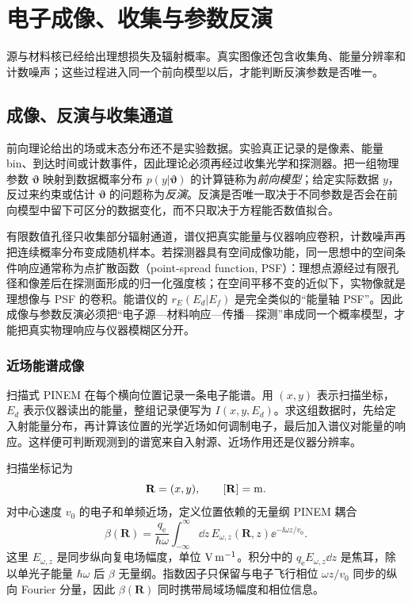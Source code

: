 \chapter{电子成像、收集与参数反演}\label{chap:electron-imaging-inversion}

源与材料核已经给出理想损失及辐射概率。真实图像还包含收集角、能量分辨率和计数噪声；这些过程进入同一个前向模型以后，才能判断反演参数是否唯一。

\section{成像、反演与收集通道}

前向理论给出的场或末态分布还不是实验数据。实验真正记录的是像素、能量 bin、到达时间或计数事件，因此理论必须再经过收集光学和探测器。把一组物理参数 $\boldsymbol\vartheta$ 映射到数据概率分布 $p(y|\boldsymbol\vartheta)$ 的计算链称为\emph{前向模型}；给定实际数据 $y$，反过来约束或估计 $\boldsymbol\vartheta$ 的问题称为\emph{反演}。反演是否唯一取决于不同参数是否会在前向模型中留下可区分的数据变化，而不只取决于方程能否数值拟合。

有限数值孔径只收集部分辐射通道，谱仪把真实能量与仪器响应卷积，计数噪声再把连续概率分布变成随机样本。若探测器具有空间成像功能，同一思想中的空间条件响应通常称为点扩散函数（point-spread function, PSF）：理想点源经过有限孔径和像差后在探测面形成的归一化强度核；在空间平移不变的近似下，实物像就是理想像与 PSF 的卷积。能谱仪的 $r_E(E_d|E_f)$ 是完全类似的“能量轴 PSF”。因此成像与参数反演必须把“电子源—材料响应—传播—探测”串成同一个概率模型，才能把真实物理响应与仪器模糊区分开。

\subsection{近场能谱成像}\label{subsec:nearfield-spectrum-imaging-dp19}

扫描式 PINEM 在每个横向位置记录一条电子能谱。用 $(x,y)$ 表示扫描坐标，$E_d$ 表示仪器读出的能量，整组记录便写为 $I(x,y,E_d)$。求这组数据时，先给定入射能量分布，再计算该位置的光学近场如何调制电子，最后加入谱仪对能量的响应。这样便可判断观测到的谱宽来自入射源、近场作用还是仪器分辨率。

扫描坐标记为
\begin{equation*}
\mathbf R=(x,y),
\qquad [\mathbf R]={\rm m}.
\end{equation*}
对中心速度 $v_0$ 的电子和单频近场，定义位置依赖的无量纲 PINEM 耦合
\begin{equation}
\boxed{
\beta(\mathbf R)
=\frac{q_{\mathrm e}}{\hbar\omega}
\int_{-\infty}^{\infty}\dd z\,
E_{\omega,z}(\mathbf R,z)
\ee^{-\ii\omega z/v_0}.}
\label{eq:pinem-spatial-beta-dp19}
\end{equation}
这里 $E_{\omega,z}$ 是同步纵向复电场幅度，单位 ${\rm V\,m^{-1}}$。积分中的 $q_{\mathrm e} E_{\omega,z}\dd z$ 是焦耳，除以单光子能量 $\hbar\omega$ 后 $\beta$ 无量纲。指数因子只保留与电子飞行相位 $\omega z/v_0$ 同步的纵向 Fourier 分量，因此 $\beta(\mathbf R)$ 同时携带局域场幅度和相位信息。

